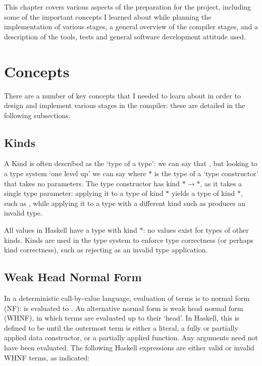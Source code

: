 \documentclass[dissertation.tex]{subfiles}
\begin{document}
This chapter covers various aspects of the preparation for the project, including some of the important concepts I
learned about while planning the implementation of various stages, a general overview of the compiler stages, and a
description of the tools, tests and general software development attitude used.

\section{Concepts}
{

    There are a number of key concepts that I needed to learn about in order to design and implement various stages in
    the compiler: these are detailed in the following subsections.

    \subsection{Kinds}\label{sec:kinds}
    {

        A Kind is often described as the `type of a type': we can say that , but looking to a type
        system `one level up' we can say  where \(*\) is the type of a `type constructor' that
        takes no parameters. The type constructor  has kind \(*\rightarrow*\), as it takes a single type
        parameter: applying it to a type of kind \(*\) yields a type of kind \(*\), such as , while
        applying it to a type with a different kind such as  produces an invalid type.
        
        All values in Haskell have a type with kind \(*\): no values exist for types of other kinds. Kinds are used in
        the type system to enforce type correctness (or perhaps kind correctness), such as rejecting 
        as an invalid type application.

    }
    \subsection{Weak Head Normal Form}\label{sec:whnf}
    {

        In a deterministic call-by-value language, evaluation of terms is to normal form (NF):  is evaluated to . An alternative normal form is weak head normal form (WHNF), in
        which terms are evaluated up to their `head'. In Haskell, this is defined to be until the outermost term is
        either a literal, a fully or partially applied data constructor, or a partially applied function. Any arguments
        need not have been evaluated. The following Haskell expressions are either valid or invalid WHNF terms, as
        indicated:

}}
\end{document}
